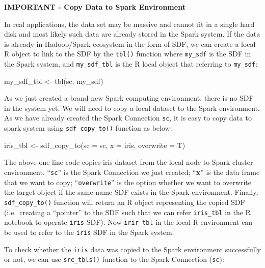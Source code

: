 \documentclass[
  12pt,
]{krantz}
\makeatletter
\newenvironment{Shaded}{\begin{snugshade}}{\end{snugshade}}
\newcommand{\AttributeTok}[1]{\textcolor[rgb]{0.61,0.61,0.61}{#1}}
\newcommand{\FunctionTok}[1]{\textcolor[rgb]{0,0,0}{#1}}
\newcommand{\NormalTok}[1]{#1}
\newcommand{\OtherTok}[1]{\textcolor[rgb]{0.37,0.37,0.37}{#1}}
\newenvironment{kframe}{%
\medskip{}
\setlength{\fboxsep}{.8em}
 \def\at@end@of@kframe{}%
 \ifinner\ifhmode%
  \def\at@end@of@kframe{\end{minipage}}%
  \begin{minipage}{\columnwidth}%
 \fi\fi%
 \def\FrameCommand##1{\hskip\@totalleftmargin \hskip-\fboxsep
 \colorbox{shadecolor}{##1}\hskip-\fboxsep
     \hskip-\linewidth \hskip-\@totalleftmargin \hskip\columnwidth}%
 \MakeFramed {\advance\hsize-\width
   \@totalleftmargin\z@ \linewidth\hsize
   \@setminipage}}%
 {\par\unskip\endMakeFramed%
 \at@end@of@kframe}
\renewenvironment{Shaded}{\begin{kframe}}{\end{kframe}}
\makeatother
\begin{document}
\textbf{IMPORTANT - Copy Data to Spark Environment}

In real applications, the data set may be massive and cannot fit in a single hard disk and most likely such data are already stored in the Spark system. If the data is already in Hadoop/Spark ecosystem in the form of SDF, we can create a local R object to link to the SDF by the \texttt{tbl()} function where \texttt{my\_sdf} is the SDF in the Spark system, and \texttt{my\_sdf\_tbl} is the R local object that referring to \texttt{my\_sdf}:

\begin{Shaded}
\begin{Highlighting}[]
\NormalTok{my\_sdf\_tbl }\OtherTok{\textless{}{-}} \FunctionTok{tbl}\NormalTok{(sc, my\_sdf)}
\end{Highlighting}
\end{Shaded}

As we just created a brand new Spark computing environment, there is no SDF in the system yet. We will need to copy a local dataset to the Spark environment. As we have already created the Spark Connection \texttt{sc}, it is easy to copy data to spark system using \texttt{sdf\_copy\_to()} function as below:

\begin{Shaded}
\begin{Highlighting}[]
\NormalTok{iris\_tbl }\OtherTok{\textless{}{-}} \FunctionTok{sdf\_copy\_to}\NormalTok{(}\AttributeTok{sc =}\NormalTok{ sc, }\AttributeTok{x =}\NormalTok{ iris, }\AttributeTok{overwrite =}\NormalTok{ T)}
\end{Highlighting}
\end{Shaded}

The above one-line code copies iris dataset from the local node to Spark cluster environment. ``\texttt{sc}'' is the Spark Connection we just created; ``\textbf{x}'' is the data frame that we want to copy; ``\texttt{overwrite}'' is the option whether we want to overwrite the target object if the same name SDF exists in the Spark environment. Finally, \texttt{sdf\_copy\_to()} function will return an R object representing the copied SDF (i.e.~creating a ``pointer'' to the SDF such that we can refer \texttt{iris\_tbl} in the R notebook to operate \texttt{iris} SDF). Now \texttt{irir\_tbl} in the local R environment can be used to refer to the \texttt{iris} SDF in the Spark system.

To check whether the \texttt{iris} data was copied to the Spark environment successfully or not, we can use \texttt{src\_tbls()} function to the Spark Connection (\texttt{sc}):
\end{document}
